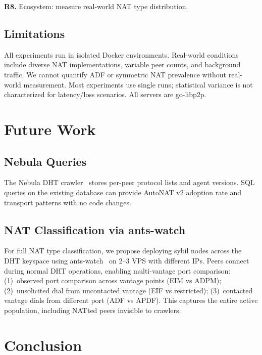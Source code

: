 \documentclass[conference]{IEEEtran}
\begin{document}
\textbf{R8.} Ecosystem: measure real-world NAT type distribution.

\subsection{Limitations}

All experiments run in isolated Docker environments. Real-world conditions include diverse NAT implementations, variable peer counts, and background traffic. We cannot quantify ADF or symmetric NAT prevalence without real-world measurement. Most experiments use single runs; statistical variance is not characterized for latency/loss scenarios. All servers are go-libp2p.

\section{Future Work}

\subsection{Nebula Queries}

The Nebula DHT crawler~\cite{nebula} stores per-peer protocol lists and agent versions. SQL queries on the existing database can provide AutoNAT v2 adoption rate and transport patterns with no code changes.

\subsection{NAT Classification via ants-watch}

For full NAT type classification, we propose deploying sybil nodes across the DHT keyspace using ants-watch~\cite{ants-watch} on 2--3 VPS with different IPs. Peers connect during normal DHT operations, enabling multi-vantage port comparison: (1)~observed port comparison across vantage points (EIM vs ADPM); (2)~unsolicited dial from uncontacted vantage (EIF vs restricted); (3)~contacted vantage dials from different port (ADF vs APDF). This captures the entire active population, including NATted peers invisible to crawlers.

\section{Conclusion}
\end{document}
